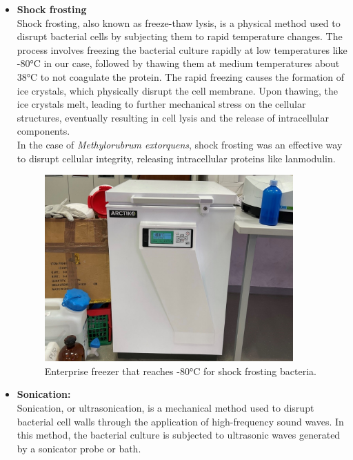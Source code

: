 \begin{itemize}
    \item \textbf{Shock frosting} \\
    Shock frosting, also known as freeze-thaw lysis, is a physical method used to disrupt
    bacterial cells by subjecting them to rapid temperature changes.
    The process involves freezing the bacterial culture rapidly at low temperatures like -80°C in our case, followed by thawing them at medium temperatures about 38°C to not coagulate the protein.
    The rapid freezing causes the formation of ice crystals, which physically
    disrupt the cell membrane.
    Upon thawing, the ice crystals melt, leading to further
    mechanical stress on the cellular structures, eventually resulting in cell lysis and the release of intracellular components. \\
    In the case of \emph{Methylorubrum extorquens}, shock frosting was an effective way to
    disrupt cellular integrity, releasing intracellular proteins like lanmodulin.
    \begin{figure}[H]
        \centering
        \includegraphics[width=0.9\textwidth]{./media/images/enterprise_freezer}
        \caption{Enterprise freezer that reaches -80°C for shock frosting bacteria.}
        \label{fig:enterprise_freezer}
    \end{figure}
    \item \textbf{Sonication:} \\
    Sonication, or ultrasonication, is a mechanical method used to disrupt bacterial cell
    walls through the application of high-frequency sound waves.
    In this method, the bacterial culture is subjected to ultrasonic waves generated by a sonicator probe or bath.

\end{itemize}
